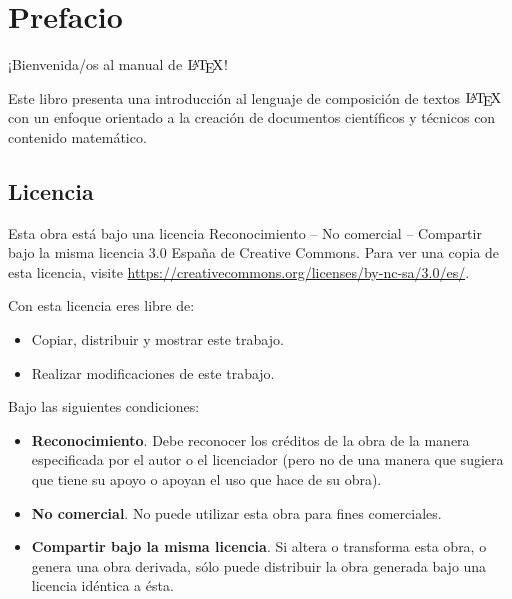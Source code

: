 \documentclass[
  a4paper,
]{scrreport}
\providecommand{\tightlist}{%
  \setlength{\itemsep}{0pt}\setlength{\parskip}{0pt}}\usepackage{longtable,booktabs,array}
\begin{document}
\hypertarget{prefacio}{%
\chapter*{Prefacio}\label{prefacio}}


¡Bienvenida/os al manual de \(\text{\LaTeX}\)!

Este libro presenta una introducción al lenguaje de composición de
textos \href{https://www.latex-project.org/}{\(\text{\LaTeX}\)} con un
enfoque orientado a la creación de documentos científicos y técnicos con
contenido matemático.

\hypertarget{licencia}{%
\section*{Licencia}\label{licencia}}


Esta obra está bajo una licencia Reconocimiento -- No comercial --
Compartir bajo la misma licencia 3.0 España de Creative Commons. Para
ver una copia de esta licencia, visite
\url{https://creativecommons.org/licenses/by-nc-sa/3.0/es/}.

Con esta licencia eres libre de:

\begin{itemize}
\tightlist
\item
  Copiar, distribuir y mostrar este trabajo.
\item
  Realizar modificaciones de este trabajo.
\end{itemize}

Bajo las siguientes condiciones:

\begin{itemize}
\item
  \textbf{Reconocimiento}. Debe reconocer los créditos de la obra de la
  manera especificada por el autor o el licenciador (pero no de una
  manera que sugiera que tiene su apoyo o apoyan el uso que hace de su
  obra).
\item
  \textbf{No comercial}. No puede utilizar esta obra para fines
  comerciales.
\item
  \textbf{Compartir bajo la misma licencia}. Si altera o transforma esta
  obra, o genera una obra derivada, sólo puede distribuir la obra
  generada bajo una licencia idéntica a ésta.
\end{itemize}
\end{document}
